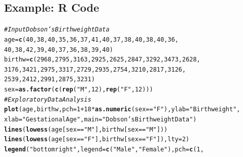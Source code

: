 \documentclass[oneside]{book}\usepackage[]{graphicx}\usepackage[svgnames]{xcolor}
\makeatletter
\newcommand{\hlnum}[1]{\textcolor[rgb]{0.686,0.059,0.569}{#1}}%
\newcommand{\hlstr}[1]{\textcolor[rgb]{0.192,0.494,0.8}{#1}}%
\newcommand{\hlcom}[1]{\textcolor[rgb]{0.678,0.584,0.686}{\textit{#1}}}%
\newcommand{\hlopt}[1]{\textcolor[rgb]{0,0,0}{#1}}%
\newcommand{\hlstd}[1]{\textcolor[rgb]{0.345,0.345,0.345}{#1}}%
\newcommand{\hlkwb}[1]{\textcolor[rgb]{0.69,0.353,0.396}{#1}}%
\newcommand{\hlkwc}[1]{\textcolor[rgb]{0.333,0.667,0.333}{#1}}%
\newcommand{\hlkwd}[1]{\textcolor[rgb]{0.737,0.353,0.396}{\textbf{#1}}}%
\newenvironment{kframe}{%
 \def\at@end@of@kframe{}%
 \ifinner\ifhmode%
  \def\at@end@of@kframe{\end{minipage}}%
  \begin{minipage}{\columnwidth}%
 \fi\fi%
 \def\FrameCommand##1{\hskip\@totalleftmargin \hskip-\fboxsep
 \colorbox{shadecolor}{##1}\hskip-\fboxsep
     \hskip-\linewidth \hskip-\@totalleftmargin \hskip\columnwidth}%
 \MakeFramed {\advance\hsize-\width
   \@totalleftmargin\z@ \linewidth\hsize
   \@setminipage}}%
 {\par\unskip\endMakeFramed%
 \at@end@of@kframe}
\newenvironment{knitrout}{}{} %
\makeatother
\begin{document}
\subsection*{Example: R Code}
\begin{knitrout}
\color{fgcolor}\begin{kframe}
\begin{alltt}
\hlcom{# Input Dobson's Birthweight Data}
\hlstd{age} \hlkwb{=} \hlkwd{c}\hlstd{(}\hlnum{40}\hlstd{,} \hlnum{38}\hlstd{,} \hlnum{40}\hlstd{,} \hlnum{35}\hlstd{,} \hlnum{36}\hlstd{,} \hlnum{37}\hlstd{,} \hlnum{41}\hlstd{,} \hlnum{40}\hlstd{,} \hlnum{37}\hlstd{,} \hlnum{38}\hlstd{,} \hlnum{40}\hlstd{,} \hlnum{38}\hlstd{,} \hlnum{40}\hlstd{,} \hlnum{36}\hlstd{,}
  \hlnum{40}\hlstd{,} \hlnum{38}\hlstd{,} \hlnum{42}\hlstd{,} \hlnum{39}\hlstd{,} \hlnum{40}\hlstd{,} \hlnum{37}\hlstd{,} \hlnum{36}\hlstd{,} \hlnum{38}\hlstd{,} \hlnum{39}\hlstd{,} \hlnum{40}\hlstd{)}
\hlstd{birthw} \hlkwb{=} \hlkwd{c}\hlstd{(}\hlnum{2968}\hlstd{,} \hlnum{2795}\hlstd{,} \hlnum{3163}\hlstd{,} \hlnum{2925}\hlstd{,} \hlnum{2625}\hlstd{,} \hlnum{2847}\hlstd{,} \hlnum{3292}\hlstd{,} \hlnum{3473}\hlstd{,} \hlnum{2628}\hlstd{,}
  \hlnum{3176}\hlstd{,} \hlnum{3421}\hlstd{,} \hlnum{2975}\hlstd{,} \hlnum{3317}\hlstd{,} \hlnum{2729}\hlstd{,} \hlnum{2935}\hlstd{,} \hlnum{2754}\hlstd{,} \hlnum{3210}\hlstd{,} \hlnum{2817}\hlstd{,} \hlnum{3126}\hlstd{,}
  \hlnum{2539}\hlstd{,} \hlnum{2412}\hlstd{,} \hlnum{2991}\hlstd{,} \hlnum{2875}\hlstd{,} \hlnum{3231}\hlstd{)}
\hlstd{sex} \hlkwb{=} \hlkwd{as.factor}\hlstd{(}\hlkwd{c}\hlstd{(}\hlkwd{rep}\hlstd{(}\hlstr{"M"}\hlstd{,} \hlnum{12}\hlstd{),} \hlkwd{rep}\hlstd{(}\hlstr{"F"}\hlstd{,} \hlnum{12}\hlstd{)))}
\hlcom{# Exploratory Data Analysis}
\hlkwd{plot}\hlstd{(age, birthw,} \hlkwc{pch} \hlstd{=} \hlnum{1} \hlopt{+} \hlnum{18} \hlopt{*} \hlkwd{as.numeric}\hlstd{(sex} \hlopt{==} \hlstr{"F"}\hlstd{),} \hlkwc{ylab} \hlstd{=} \hlstr{"Birthweight"}\hlstd{,}
  \hlkwc{xlab} \hlstd{=} \hlstr{"Gestational Age"}\hlstd{,} \hlkwc{main} \hlstd{=} \hlstr{"Dobson's Birthweight Data"}\hlstd{)}
\hlkwd{lines}\hlstd{(}\hlkwd{lowess}\hlstd{(age[sex} \hlopt{==} \hlstr{"M"}\hlstd{], birthw[sex} \hlopt{==} \hlstr{"M"}\hlstd{]))}
\hlkwd{lines}\hlstd{(}\hlkwd{lowess}\hlstd{(age[sex} \hlopt{==} \hlstr{"F"}\hlstd{], birthw[sex} \hlopt{==} \hlstr{"F"}\hlstd{]),} \hlkwc{lty} \hlstd{=} \hlnum{2}\hlstd{)}
\hlkwd{legend}\hlstd{(}\hlstr{"bottomright"}\hlstd{,} \hlkwc{legend} \hlstd{=} \hlkwd{c}\hlstd{(}\hlstr{"Male"}\hlstd{,} \hlstr{"Female"}\hlstd{),} \hlkwc{pch} \hlstd{=} \hlkwd{c}\hlstd{(}\hlnum{1}\hlstd{,}

\end{alltt}
\end{kframe}
\end{knitrout}
\end{document}

